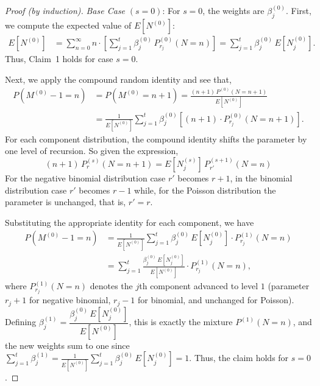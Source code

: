 \documentclass[11pt]{amsart}
\theoremstyle{definition}
\theoremstyle{plain}
\begin{document}
\begin{proof}[Proof (by induction)]
\textit{Base Case} $(s = 0)$: For $s = 0$, the weights are $\beta_j^{(0)}$.  First, we
compute the expected value of $E[N^{(0)}]$:
\begin{align*}
E[N^{(0)}]
    &= \sum_{n=0}^{\infty} n \cdot \left[\sum_{j=1}^{t}\beta_j^{(0)}\,P_{r_j}^{(0)}(N=n)\right]
     = \sum_{j=1}^{t}\beta_j^{(0)}\,E[N_j^{(0)}].
\end{align*}
Thus, Claim~1 holds for case $s = 0$.

Next, we apply the compound random identity and see that,
\begin{align*}
P(M^{(0)} - 1 = n)
    &= P(M^{(0)} = n+1)
     = \frac{(n+1)\,P^{(0)}(N = n+1)}{E[N^{(0)}]} \\
    &= \frac{1}{E[N^{(0)}]}
       \sum_{j=1}^{t}\beta_j^{(0)}\!\left[(n+1)\cdot P_{r_j}^{(0)}(N = n+1)\right].
\end{align*}
For each component distribution, the compound identity shifts the parameter by one level of
recursion. So given the expression, 
\[
    (n+1)\,P_r^{(s)}(N = n+1) = E[N_{j}^{(s)}]\, P_{r'}^{(s+1)}(N = n)
\]
For the negative binomial distribution case $r'$ becomes $r+1$, in the binomial distribution case $r'$ becomes $r-1$ while,
for the Poisson distribution the parameter is unchanged, that is,  $r'= r$.

Substituting the appropriate identity for each component, we have
\begin{align*}
P(M^{(0)} - 1 = n)
    &= \frac{1}{E[N^{(0)}]}
       \sum_{j=1}^{t}\beta_j^{(0)}\, E[N_j^{(0)}] \cdot P_{r_j}^{(1)}(N = n) \\
    &= \sum_{j=1}^{t}
       \frac{\beta_j^{(0)}\, E[N_j^{(0)}]}{E[N^{(0)}]} \cdot P_{r_j}^{(1)}(N = n),
\end{align*}
where $P_{r_j}^{(1)}(N = n)$ denotes the $j$th component advanced to level $1$ (parameter
$r_j + 1$ for negative binomial, $r_j - 1$ for binomial, and unchanged for Poisson).
Defining $\beta_j^{(1)} = \dfrac{\beta_j^{(0)}\, E[N_j^{(0)}]}{E[N^{(0)}]}$, this is exactly
the mixture $P^{(1)}(N = n)$, and the new weights sum to one since
$\sum_{j=1}^{t}\beta_j^{(1)} = \frac{1}{E[N^{(0)}]}\sum_{j=1}^{t}\beta_j^{(0)}\,E[N_j^{(0)}] = 1$.
Thus, the claim holds for $s = 0$.


\end{proof}
\end{document}
